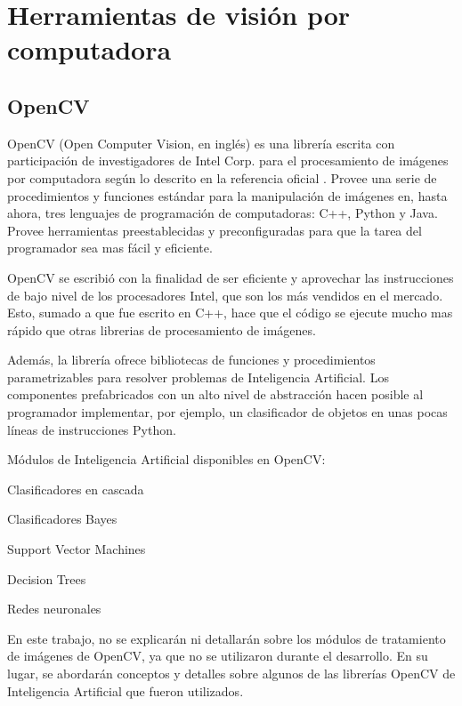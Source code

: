 \documentclass[a4paper,12pt,oneside,spanish]{book}
\begin{document}
\section{Herramientas de visión por computadora}

\subsection{OpenCV}

OpenCV (Open Computer Vision, en inglés) es una librería escrita con participación de investigadores de Intel Corp. para el procesamiento de imágenes por computadora según lo descrito en la referencia oficial \cite{opencv1}. Provee una serie de procedimientos y funciones estándar para la manipulación de imágenes en, hasta ahora, tres lenguajes de programación de computadoras: C++,  Python y Java. Provee herramientas preestablecidas y preconfiguradas para que la tarea del programador sea mas fácil y eficiente. \par

OpenCV se escribió con la finalidad de ser eficiente y aprovechar las instrucciones de bajo nivel de los procesadores Intel, que son los más vendidos en el mercado. Esto, sumado a que fue escrito en C++, hace que el código se ejecute mucho mas rápido que otras librerias de procesamiento de imágenes.\par

Además, la librería ofrece bibliotecas de funciones y procedimientos parametrizables para resolver problemas de Inteligencia Artificial. Los componentes prefabricados con un alto nivel de abstracción hacen posible al programador implementar, por ejemplo, un clasificador de objetos en unas pocas líneas de instrucciones Python.\par

Módulos de Inteligencia Artificial disponibles en OpenCV:
\begin{compactitem}
	\item Clasificadores en cascada	
	\item Clasificadores Bayes
	\item Support Vector Machines
	\item Decision Trees 
	\item Redes neuronales 
\end{compactitem}

En este trabajo, no se explicarán ni detallarán sobre los módulos de tratamiento de imágenes de OpenCV, ya que no se utilizaron durante el desarrollo. En su lugar, se abordarán conceptos y detalles sobre algunos de las librerías OpenCV de Inteligencia Artificial que fueron utilizados.\par
\end{document}
